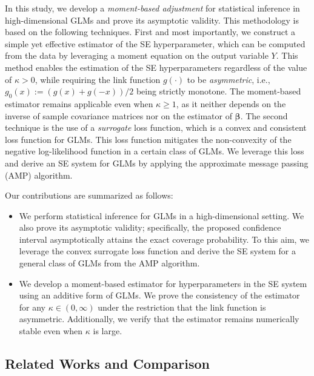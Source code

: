 \documentclass[12pt,reqno]{amsart}
\newcommand{\rc}{\color{black}}
\newcommand{\cc}{\color{black}}
\def\bbeta{\bm{\beta}}
\begin{document}
In this study, we develop a \textit{moment-based adjustment} for statistical inference in high-dimensional GLMs and prove its asymptotic validity.
This methodology is based on the following techniques.
First and most importantly, we construct a simple yet effective estimator of the SE hyperparameter, which can be computed from the data by leveraging a moment equation on the output variable $Y$.
{\rc This method enables the estimation of the SE hyperparameters regardless of the value of $\kappa > 0$, while requiring the link function $g(\cdot)$ to be \textit{asymmetric}, i.e., $g_0(x):=(g(x)+g(-x))/2$ being strictly monotone.}
The moment-based estimator remains applicable even when $\kappa \geq 1$, as it neither depends on the inverse of sample covariance matrices nor on the estimator of $\bbeta$.
The second technique is the use of {\cc a} \textit{surrogate} loss function, which is a convex and consistent loss function for GLMs.
This loss function mitigates the non-convexity of the negative log-likelihood function in a certain class of GLMs.
We leverage this loss and derive an SE system for GLMs by applying the approximate message passing (AMP) algorithm.



Our contributions are summarized as follows:
\setlength{\leftmargini}{17pt} 
\begin{itemize}
  \setlength{\parskip}{0cm}
  \setlength{\itemsep}{0cm}
    \item We perform statistical inference for GLMs in a high-dimensional setting.
    We also prove its asymptotic validity; specifically, the proposed confidence interval asymptotically attains the exact coverage probability. To this aim, we leverage the convex surrogate loss function and derive the SE system for a general class of GLMs from the AMP algorithm. 
    \item We develop a moment-based estimator for hyperparameters in the SE system using an additive form of GLMs.
    We prove the consistency of the estimator for any $\kappa\in(0,\infty)$ under the restriction that the link function is asymmetric.
    Additionally, we verify that the estimator remains numerically stable even when $\kappa$ is large.
\end{itemize}







\subsection{Related Works and Comparison}
\end{document}

